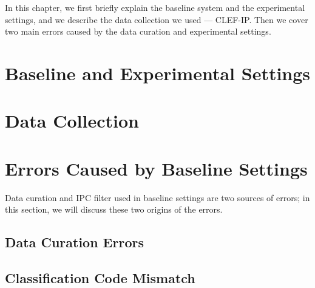 \label{cha:BaselineIRFramework}
In this chapter, we first briefly explain the baseline system and the experimental settings, 
and we describe the data collection we used --- CLEF-IP. Then we cover two main errors caused by the data curation and experimental settings.
\section{Baseline and Experimental Settings}
\label{sec:settings}

\section{Data Collection}
\label{sec:DataCollection}

\section{Errors Caused by Baseline Settings}
Data curation and IPC filter used in baseline settings are two sources of errors;
in this section, we will discuss these two origins of the errors.

\subsection{Data Curation Errors}
\label{sec:DataCurationErrors}

\subsection{Classification Code Mismatch}
\label{sec:ClassificationCodeMismatch}


%


